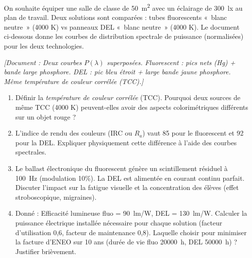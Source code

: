 \documentclass[11pt]{article}
\begin{document}
\begin{exercice}
On souhaite équiper une salle de classe de \SI{50}{m^2} avec un éclairage de \SI{300}{lx} au plan de travail. Deux solutions sont comparées : tubes fluorescents «~blanc neutre~» (4000 K) vs panneaux DEL «~blanc neutre~» (4000 K). Le document ci-dessous donne les courbes de distribution spectrale de puissance (normalisées) pour les deux technologies.
\begin{center}
\textit{[Document : Deux courbes $P(\lambda)$ superposées. Fluorescent : pics nets (Hg) + bande large phosphore. DEL : pic bleu étroit + large bande jaune phosphore. Même température de couleur corrélée (TCC).]}
\end{center}
\begin{enumerate}
    \item Définir la \textit{température de couleur corrélée} (TCC). Pourquoi deux sources de même TCC (4000 K) peuvent-elles avoir des aspects colorimétriques différents sur un objet rouge ?
    \item L'indice de rendu des couleurs (IRC ou $R_a$) vaut 85 pour le fluorescent et 92 pour la DEL. Expliquer physiquement cette différence à l'aide des courbes spectrales.
    \item Le ballast électronique du fluorescent génère un scintillement résiduel à \SI{100}{Hz} (modulation 10\%). La DEL est alimentée en courant continu parfait. Discuter l'impact sur la fatigue visuelle et la concentration des élèves (effet stroboscopique, migraines).
    \item Donné : Efficacité lumineuse fluo = \SI{90}{lm/W}, DEL = \SI{130}{lm/W}. Calculer la puissance électrique installée nécessaire pour chaque solution (facteur d'utilisation 0,6, facteur de maintenance 0,8). Laquelle choisir pour minimiser la facture d'ENEO sur 10 ans (durée de vie fluo \SI{20000}{h}, DEL \SI{50000}{h}) ? Justifier brièvement.
\end{enumerate}
\end{exercice}
\end{document}
